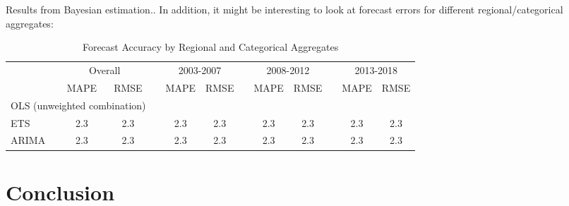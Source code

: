 \documentclass[a4paper,fleqn,11pt]{article}
\begin{document}
Results from Bayesian estimation.. In addition, it might be interesting to look at forecast errors for different regional/categorical aggregates:
\begin{table}[H]
\centering
\caption{Forecast Accuracy by Regional and Categorical Aggregates}
\small
\begin{tabularx}{\textwidth}{Xcclcclcclcc}
\toprule
& \multicolumn{2}{c}{Overall} & & \multicolumn{2}{c}{2003-2007} & & \multicolumn{2}{c}{2008-2012} & & \multicolumn{2}{c}{2013-2018}\\
\cmidrule{2-3} \cmidrule{5-6} \cmidrule{8-9} \cmidrule{11-12}
& \scriptsize{MAPE} & \scriptsize{RMSE} & & \scriptsize{MAPE} & \scriptsize{RMSE} & & \scriptsize{MAPE} & \scriptsize{RMSE} & & \scriptsize{MAPE} & \scriptsize{RMSE}\\ 
\midrule
\multicolumn{3}{l}{OLS (unweighted combination) } &&  & && & && & \\ 
\quad \scriptsize{ETS} & 2.3 & 2.3  && 2.3 & 2.3 && 2.3 & 2.3 && 2.3 & 2.3\\ 
\quad \scriptsize{ARIMA} & 2.3 & 2.3  && 2.3 & 2.3 && 2.3 & 2.3 && 2.3 & 2.3\\ 
\bottomrule
\end{tabularx}
\end{table}



\clearpage

\section{Conclusion}







\clearpage

\setcounter{page}{3}



\clearpage



\end{document}
